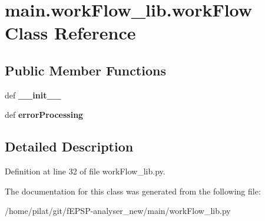 \hypertarget{classmain_1_1work_flow__lib_1_1work_flow}{\section{main.\-work\-Flow\-\_\-lib.\-work\-Flow Class Reference}
\label{classmain_1_1work_flow__lib_1_1work_flow}
}
\subsection*{Public Member Functions}
\begin{DoxyCompactItemize}
\item 
\hypertarget{classmain_1_1work_flow__lib_1_1work_flow_ae866e4d18cfb177554da57976f61d383}{def {\bfseries \-\_\-\-\_\-init\-\_\-\-\_\-}}\label{classmain_1_1work_flow__lib_1_1work_flow_ae866e4d18cfb177554da57976f61d383}

\item 
\hypertarget{classmain_1_1work_flow__lib_1_1work_flow_a09964fa6736a23db1844004815ccb55b}{def {\bfseries error\-Processing}}\label{classmain_1_1work_flow__lib_1_1work_flow_a09964fa6736a23db1844004815ccb55b}

\end{DoxyCompactItemize}


\subsection{Detailed Description}


Definition at line 32 of file work\-Flow\-\_\-lib.\-py.



The documentation for this class was generated from the following file\-:\begin{DoxyCompactItemize}
\item 
/home/pilat/git/f\-E\-P\-S\-P-\/analyser\-\_\-new/main/work\-Flow\-\_\-lib.\-py\end{DoxyCompactItemize}
